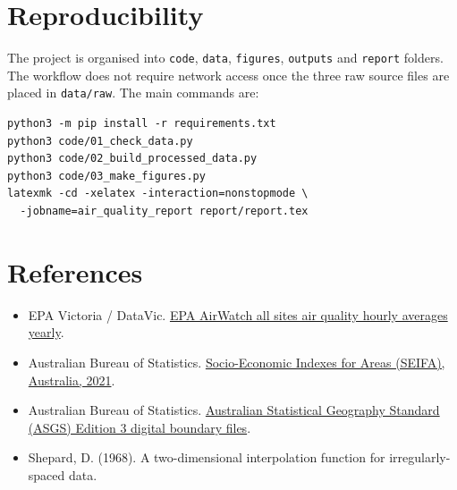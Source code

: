 \documentclass[11pt,a4paper]{article}
\begin{document}
\section{Reproducibility}

The project is organised into \texttt{code}, \texttt{data}, \texttt{figures}, \texttt{outputs} and \texttt{report} folders. The workflow does not require network access once the three raw source files are placed in \texttt{data/raw}. The main commands are:

\begin{verbatim}
python3 -m pip install -r requirements.txt
python3 code/01_check_data.py
python3 code/02_build_processed_data.py
python3 code/03_make_figures.py
latexmk -cd -xelatex -interaction=nonstopmode \
  -jobname=air_quality_report report/report.tex
\end{verbatim}

\section*{References}

\begin{itemize}[leftmargin=*]
  \item EPA Victoria / DataVic. \href{https://discover.data.vic.gov.au/dataset/epa-air-watch-all-sites-air-quality-hourly-averages-yearly}{EPA AirWatch all sites air quality hourly averages yearly}.
  \item Australian Bureau of Statistics. \href{https://www.abs.gov.au/statistics/people/people-and-communities/socio-economic-indexes-areas-seifa-australia/2021}{Socio-Economic Indexes for Areas (SEIFA), Australia, 2021}.
  \item Australian Bureau of Statistics. \href{https://www.abs.gov.au/statistics/standards/australian-statistical-geography-standard-asgs-edition-3/jul2021-jun2026/access-and-downloads/digital-boundary-files}{Australian Statistical Geography Standard (ASGS) Edition 3 digital boundary files}.
  \item Shepard, D. (1968). A two-dimensional interpolation function for irregularly-spaced data.
\end{itemize}
\end{document}
